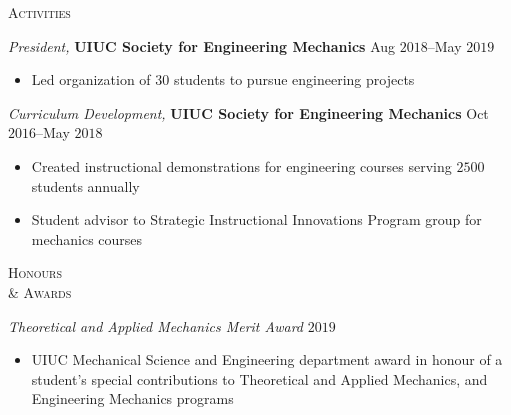 \documentclass[10pt]{article}
\begin{document}
\vspace{-1.5em}
\begin{multicols}{2}
\textsc{Activities}
\columnbreak

\textit{President,} \textbf{UIUC Society for Engineering Mechanics} \hfill Aug $2018$--May $2019$

\vspace{-1.75em}
\begin{itemize}[label=-]
    \setlength\itemsep{-0.25em}
    \setlength{\itemindent}{-1.50em}
    \item Led organization of $30$ students to pursue engineering projects
\end{itemize}
\vspace{-2.0em}

\vspace{0.5em}
%
\textit{Curriculum Development,} \textbf{UIUC Society for Engineering Mechanics} \hfill Oct $2016$--May $2018$

\vspace{-1.75em}
\begin{itemize}[label=-]
    \setlength\itemsep{-0.25em}
    \setlength{\itemindent}{-1.50em}
    \item Created instructional demonstrations for engineering courses serving $2500$ students annually
    \item Student advisor to Strategic Instructional Innovations Program group for mechanics courses
\end{itemize}
\vspace{-2.0em}

\end{multicols}
\vspace{-1.5em} 
\begin{multicols}{2}
\textsc{Honours \\ \& Awards}
\columnbreak

\textit{Theoretical and Applied Mechanics Merit Award} \hfill $2019$

\vspace{-1.75em}
\begin{itemize}[label= ]
    \setlength{\itemindent}{-2.50em}
    \item[]  UIUC Mechanical Science and Engineering department award in honour of a student's special contributions to Theoretical and Applied Mechanics, and Engineering Mechanics programs
\end{itemize}
\vspace{-2.0em}

\end{multicols}
\end{document}
